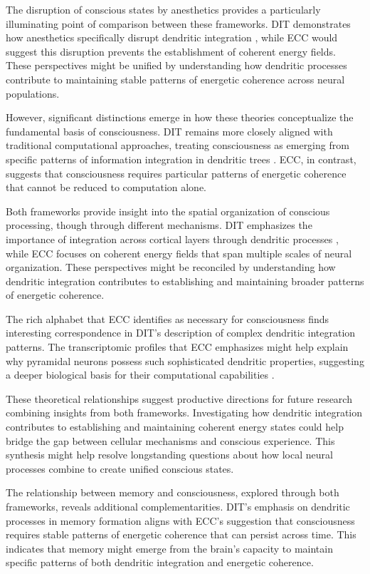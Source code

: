 The disruption of conscious states by anesthetics provides a particularly illuminating point of comparison between these frameworks. DIT demonstrates how anesthetics specifically disrupt dendritic integration \cite{Suzuki2020}, while ECC would suggest this disruption prevents the establishment of coherent energy fields. These perspectives might be unified by understanding how dendritic processes contribute to maintaining stable patterns of energetic coherence across neural populations.

However, significant distinctions emerge in how these theories conceptualize the fundamental basis of consciousness. DIT remains more closely aligned with traditional computational approaches, treating consciousness as emerging from specific patterns of information integration in dendritic trees \cite{Larkum2013}. ECC, in contrast, suggests that consciousness requires particular patterns of energetic coherence that cannot be reduced to computation alone.

Both frameworks provide insight into the spatial organization of conscious processing, though through different mechanisms. DIT emphasizes the importance of integration across cortical layers through dendritic processes \cite{Phillips2018}, while ECC focuses on coherent energy fields that span multiple scales of neural organization. These perspectives might be reconciled by understanding how dendritic integration contributes to establishing and maintaining broader patterns of energetic coherence.

The rich alphabet that ECC identifies as necessary for consciousness finds interesting correspondence in DIT's description of complex dendritic integration patterns. The transcriptomic profiles that ECC emphasizes might help explain why pyramidal neurons possess such sophisticated dendritic properties, suggesting a deeper biological basis for their computational capabilities \cite{Aru2019}.

These theoretical relationships suggest productive directions for future research combining insights from both frameworks. Investigating how dendritic integration contributes to establishing and maintaining coherent energy states could help bridge the gap between cellular mechanisms and conscious experience. This synthesis might help resolve longstanding questions about how local neural processes combine to create unified conscious states.

The relationship between memory and consciousness, explored through both frameworks, reveals additional complementarities. DIT's emphasis on dendritic processes in memory formation \cite{Shin2021} aligns with ECC's suggestion that consciousness requires stable patterns of energetic coherence that can persist across time. This indicates that memory might emerge from the brain's capacity to maintain specific patterns of both dendritic integration and energetic coherence.

